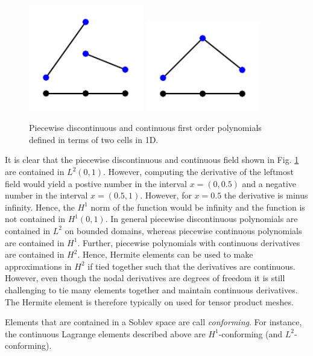 \begin{figure}
\begin{center}
\includegraphics[width=5cm]{chapters/element/dg.pdf}
\includegraphics[width=5cm]{chapters/element/cg.pdf}
\caption{Piecewise discontinuous and continuous first order polynomials defined in terms of two cells in 1D. }  
\label{fig:dgcg}
\end{center}
\end{figure}



It is clear that the piecewise discontinuous and continuous field shown  in Fig. \ref{fig:dgcg} are contained in $L^2(0,1)$. 
However, computing the derivative of the leftmost field would yield a postive number in the interval $x=(0,0.5)$ and a negative number
in the interval $x=(0.5,1)$. However, for $x=0.5$ the derivative is minus infinity. Hence, the $H^1$ norm of the function would be
infinity and the function is not contained in $H^1(0,1)$. 
In general piecewise discontinuous polynomials are contained in $L^2$ on bounded domains, whereas 
piecewise continuous polynomials are contained in $H^1$. Further, piecewise polynomials with continuous derivatives are contained in $H^2$.   
Hence, Hermite elements can be used to make approximations in $H^2$ if tied together such that the derivatives are continuous. However, even
though the nodal derivatives are degrees of freedom it is still challenging to tie many elements together and maintain continuous derivatives. 
The Hermite element is therefore typically on used for tensor product meshes. 

Elements that are contained in a Soblev space are call \emph{conforming}. For instance, the continuous Lagrange elements  described above are $H^1$-conforming (and $L^2$-conforming). 

